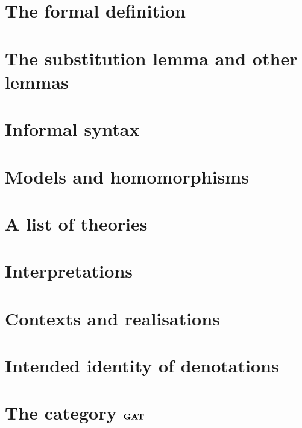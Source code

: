 \lipsum[4]

\section{The formal definition} \label{sec:source-1-6}

\lipsum[5]

\section{The substitution lemma and other lemmas} \label{sec:source-1-7}

\lipsum[6]

\section{Informal syntax} \label{sec:source-1-8}

\lipsum[7]

\section{Models and homomorphisms} \label{sec:source-1-9}

\lipsum[8]

\section{A list of theories} \label{sec:source-1-10}

\lipsum[9]

\section{Interpretations} \label{sec:source-1-11}

\lipsum[10]

\section{Contexts and realisations} \label{sec:source-1-12}

\lipsum[11]

\section{Intended identity of denotations} \label{sec:source-1-13}

\lipsum[12]

\section{The category $\mathbf{GAT}$} \label{sec:source-1-14}

\lipsum[13]

